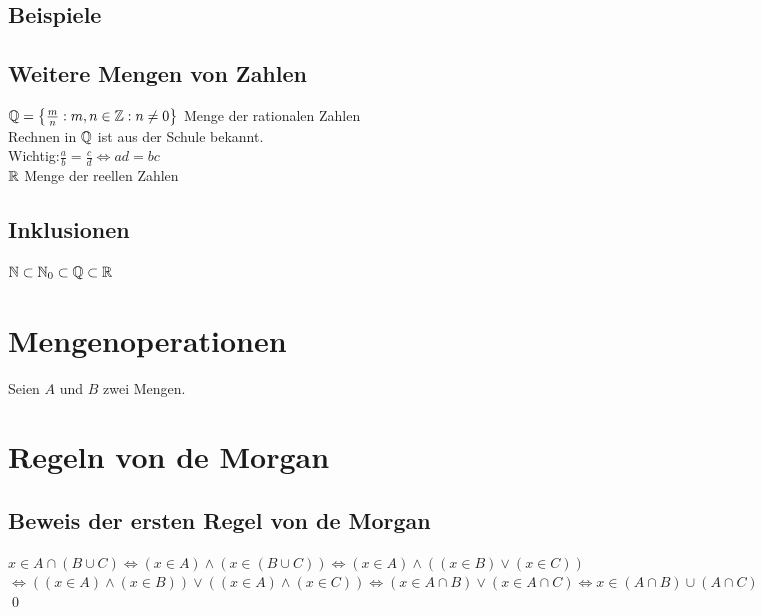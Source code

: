 \subsection*{Beispiele}

\subsection*{Weitere Mengen von Zahlen}\label{Rationale Zahlen}
$\mathbb{Q} = \left \{ \frac{m}{n} : m,n \in \mathbb{Z} : n \neq 0 \right \}$ Menge der rationalen Zahlen\\
Rechnen in $\mathbb{Q}$ ist aus der Schule bekannt.\\
Wichtig:$\frac{a}{b} = \frac{c}{d} \Leftrightarrow ad = bc$\\
$\mathbb{R}$ Menge der reellen Zahlen

\subsection*{Inklusionen}
$\mathbb{N} \subset \mathbb{N}_0 \subset \mathbb{Q} \subset \mathbb{R}$

\section{Mengenoperationen}\label{1.4}
Seien $A$ und $B$ zwei Mengen.

\section{Regeln von de Morgan}\label{1.5}

\subsection*{Beweis der ersten Regel von de Morgan}
$x \in A \cap (B \cup C) \Leftrightarrow (x \in A) \wedge (x \in (B \cup C)) \Leftrightarrow (x \in A) \wedge ((x \in B) \vee (x \in C))$\\
$\Leftrightarrow ((x \in A) \wedge (x \in B)) \vee ((x \in A) \wedge (x \in C)) \Leftrightarrow (x \in A \cap B) \vee (x \in A \cap C) \Leftrightarrow x \in (A \cap B) \cup (A \cap C)$ \\
\qed

